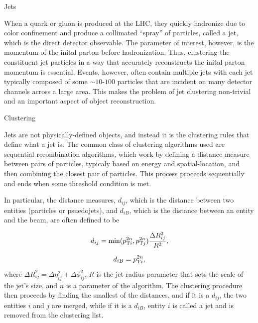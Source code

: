 \begin{section}{Jets}

When a quark or gluon is produced at the LHC, they quickly hadronize due to color confinement and produce a collimated ``spray'' of particles, called a jet, which is the direct detector observable.
The parameter of interest, however, is the momentum of the inital parton before hadronization.
Thus, clustering the constituent jet particles in a way that accurately reconstructs the inital parton momentum is essential.
Events, however, often contain multiple jets with each jet typically composed of some $\sim$$10$-$100$ particles that are incident on many detector channels across a large area.
This makes the problem of jet clustering non-trivial and an important aspect of object reconstruction.

\begin{subsection}{Clustering}

Jets are not physically-defined objects, and instead it is the clustering rules that define what a jet is.
The common class of clustering algorithms used are sequential recombination algorithms, which work by defining a distance measure between pairs of particles, typicaly based on energy and spatial-location, and then combining the closest pair of particles.
This process proceeds sequentially and ends when some threshold condition is met.

In particular, the distance measures, $d_{ij}$, which is the distance between two entities (particles or psuedojets), and $d_{iB}$, which is the distance between an entity and the beam, are often defined to be

\begin{equation}
d_{ij} = \mathrm{min}(p_{\mathrm{T}i}^{2n},p_{\mathrm{T}j}^{2n})\frac{\Delta R_{ij}^{2}}{R^2},
\label{clustering_dij}
\end{equation}

\begin{equation}
d_{iB} = p_{\mathrm{T}i}^{2n},
\label{clustering_diB}
\end{equation}
where $\Delta R_{ij}^{2} = \Delta \eta_{ij}^{2} + \Delta \phi_{ij}^2$, $R$ is the jet radius parameter that sets the scale of the jet's size, and $n$ is a parameter of the algorithm.
The clustering procedure then proceeds by finding the smallest of the distances, and if it is a $d_{ij}$, the two entities $i$ and $j$ are merged, while if it is a $d_{iB}$, entity $i$ is called a jet and is removed from the clustering list.


\end{subsection}
\end{section}
